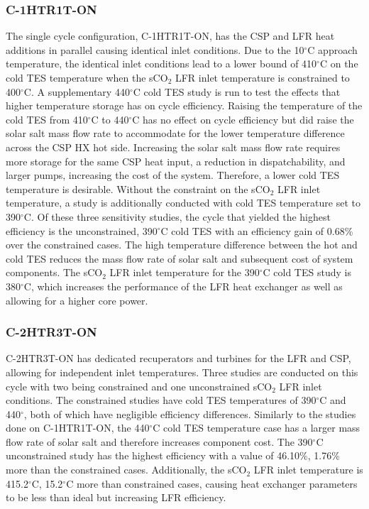 \begin{paracol}{2}
\subsubsection{C-1HTR1T-ON}
The single cycle configuration, C-1HTR1T-ON, has the CSP and LFR heat additions in parallel causing identical inlet conditions. Due to the 10$^{\circ}$C approach temperature, the identical inlet conditions lead to a lower bound of 410$^{\circ}$C on the cold TES temperature when the sCO$_2$ LFR inlet temperature is constrained to 400$^{\circ}$C. A supplementary 440$^{\circ}$C cold TES study is run to test the effects that higher temperature storage has on cycle efficiency. Raising the temperature of the cold TES from 410$^{\circ}$C to 440$^{\circ}$C has no effect on cycle efficiency but did raise the solar salt mass flow rate to accommodate for the lower temperature difference across the CSP HX hot side. Increasing the solar salt mass flow rate requires more storage for the same CSP heat input, a reduction in dispatchability, and larger pumps, increasing the cost of the system. Therefore, a lower cold TES temperature is desirable. Without the constraint on the sCO$_2$ LFR inlet temperature, a study is additionally conducted with cold TES temperature set to 390$^{\circ}$C. Of these three sensitivity studies, the cycle that yielded the highest efficiency is the unconstrained, 390$^{\circ}$C cold TES with an efficiency gain of 0.68\% over the constrained cases. The high temperature difference between the hot and cold TES reduces the mass flow rate of solar salt and subsequent cost of system components. The sCO$_2$ LFR inlet temperature for the 390$^{\circ}$C cold TES study is 380$^{\circ}$C, which increases the performance of the LFR heat exchanger as well as allowing for a higher core power. 

\subsubsection{C-2HTR3T-ON}
C-2HTR3T-ON has dedicated recuperators and turbines for the LFR and CSP, allowing for independent inlet temperatures. Three studies are conducted on this cycle with two being constrained and one unconstrained sCO$_2$ LFR inlet conditions. The constrained studies have cold TES temperatures of 390$^{\circ}$C and 440$^{\circ}$, both of which have negligible efficiency differences. Similarly to the studies done on C-1HTR1T-ON, the 440$^{\circ}$C cold TES temperature case has a larger mass flow rate of solar salt and therefore increases component cost. The 390$^{\circ}$C unconstrained study has the highest efficiency with a value of 46.10\%, 1.76\% more than the constrained cases. Additionally, the sCO$_2$ LFR inlet temperature is 415.2$^{\circ}$C, 15.2$^{\circ}$C more than constrained cases, causing heat exchanger parameters to be less than ideal but increasing LFR efficiency. 


\end{paracol}
